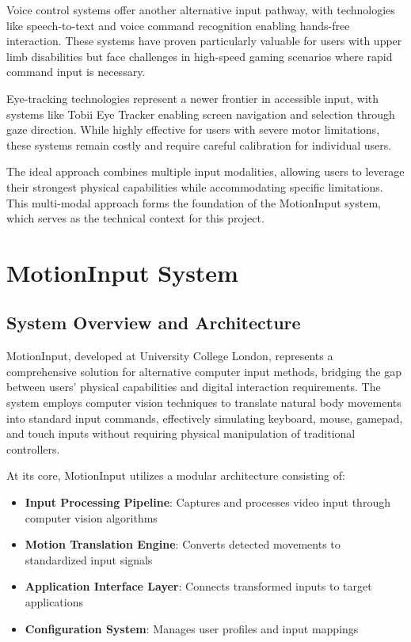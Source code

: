 Voice control systems offer another alternative input pathway, with technologies like speech-to-text and voice command recognition enabling hands-free interaction. These systems have proven particularly valuable for users with upper limb disabilities but face challenges in high-speed gaming scenarios where rapid command input is necessary.

Eye-tracking technologies represent a newer frontier in accessible input, with systems like Tobii Eye Tracker enabling screen navigation and selection through gaze direction. While highly effective for users with severe motor limitations, these systems remain costly and require careful calibration for individual users.

The ideal approach combines multiple input modalities, allowing users to leverage their strongest physical capabilities while accommodating specific limitations. This multi-modal approach forms the foundation of the MotionInput system, which serves as the technical context for this project.

\section{MotionInput System}
\subsection{System Overview and Architecture}
MotionInput, developed at University College London, represents a comprehensive solution for alternative computer input methods, bridging the gap between users' physical capabilities and digital interaction requirements. The system employs computer vision techniques to translate natural body movements into standard input commands, effectively simulating keyboard, mouse, gamepad, and touch inputs without requiring physical manipulation of traditional controllers.

At its core, MotionInput utilizes a modular architecture consisting of:

\begin{itemize}
    \item \textbf{Input Processing Pipeline}: Captures and processes video input through computer vision algorithms
    \item \textbf{Motion Translation Engine}: Converts detected movements to standardized input signals
    \item \textbf{Application Interface Layer}: Connects transformed inputs to target applications
    \item \textbf{Configuration System}: Manages user profiles and input mappings
\end{itemize}

